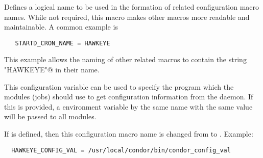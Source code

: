 \begin{description}

\label{param:StartdCronName}
\item[\Macro{STARTD\_CRON\_NAME}]
  Defines a logical name to be used in the formation of related
  configuration macro names. While
  not required, this macro makes other macros
  more readable and maintainable.  A common example is
\begin{verbatim}
   STARTD_CRON_NAME = HAWKEYE
\end{verbatim}
  This example allows the naming of other related macros
  to contain the string \verb@"HAWKEYE"@ in their name.

\label{param:StartdCronConfigVal}
\item[\Macro{STARTD\_CRON\_CONFIG\_VAL}]
  This configuration variable can be used to specify the
   program which the modules (jobs) should use to
  get configuration information from the daemon.  If this is provided,
  a environment variable by the same name with the same value will be
  passed to all modules.

  If 
  is defined, then this configuration macro name is changed from
   to
  .  Example:

\begin{verbatim}
  HAWKEYE_CONFIG_VAL = /usr/local/condor/bin/condor_config_val
\end{verbatim}


\end{description}
